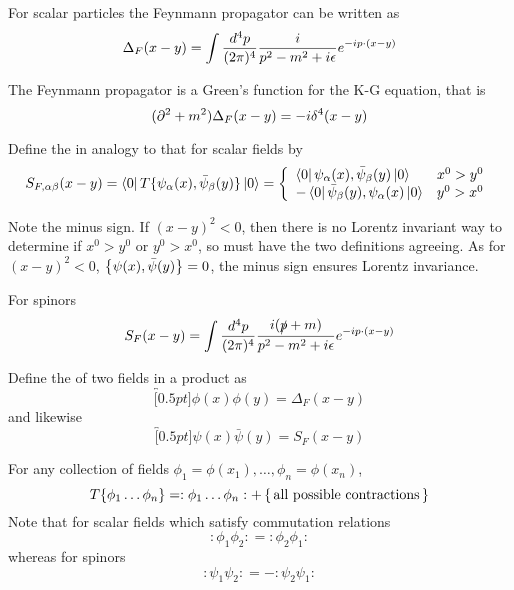 \documentclass{article}
\begin{document}
\begin{theorem}
For scalar particles the Feynmann propagator can be written as 
\[
\Delta_F(x-y) = \int \fmeas \frac{i}{p^2-m^2+i\eps} e^{-ip\cdot(x-y)}
\]
\end{theorem}

\begin{corollary}
The Feynmann propagator is a Green's function for the K-G equation, that is 
\[
(\del^2+m^2)\Delta_F(x-y) = -i \delta^4(x-y)
\]
\end{corollary}

\begin{definition}
Define the  in analogy to that for scalar fields by 
\[
S_{F,\alpha\beta}(x-y)=\bra{0} T\{ \psi_\alpha(x), \bar{\psi}_\beta(y) \} \ket{0} = \left\{ \begin{array}{lc} \bra{0} \psi_\alpha(x), \bar{\psi}_\beta(y)  \ket{0} & x^0 > y^0 \\
    -\bra{0} \bar{\psi}_\beta(y), \psi_\alpha(x) \ket{0} & y^0 > x^0 
    \end{array} \right. \\ 
\]
\end{definition}

\begin{idea}
Note the minus sign. If $(x-y)^2 < 0$, then there is no Lorentz invariant way to determine if $x^0 > y^0$ or $y^0 > x^0$, so must have the two definitions agreeing. As for $(x-y)^2 < 0$, $\acomm[\psi(x)]{\bar{\psi}(y)}=0$, the minus sign ensures Lorentz invariance. 
\end{idea}

\begin{theorem}
For spinors 
\[
S_F(x-y) = \int \fmeas \frac{i(\slashed{p}+m)}{p^2-m^2+i\eps} e^{-ip\cdot (x-y)}
\]
\end{theorem}

\begin{definition}[Contraction]
Define the  of two fields in a product as 
\[
\overbracket[0.5pt]{\phi(x)\phi(y)} = \Delta_F(x-y)
\]
and likewise 
\[
\overbracket[0.5pt]{\psi(x)\bar{\psi}(y)} = S_F(x-y)
\]
\end{definition}

\begin{theorem}
For any collection of fields $\phi_1 = \phi(x_1), \dots, \phi_n = \phi(x_n)$, 
\[
T \{ \phi_1 \dots \phi_n \} = :\phi_1 \dots \phi_n: + \set{\text{all possible contractions}}
\]
Note that for scalar fields which satisfy commutation relations 
\[
:\phi_1 \phi_2: = :\phi_2 \phi_1 : 
\]
whereas for spinors 
\[
:\psi_1 \psi_2: = -:\psi_2 \psi_1 : 
\]
\end{theorem}
\end{document}
